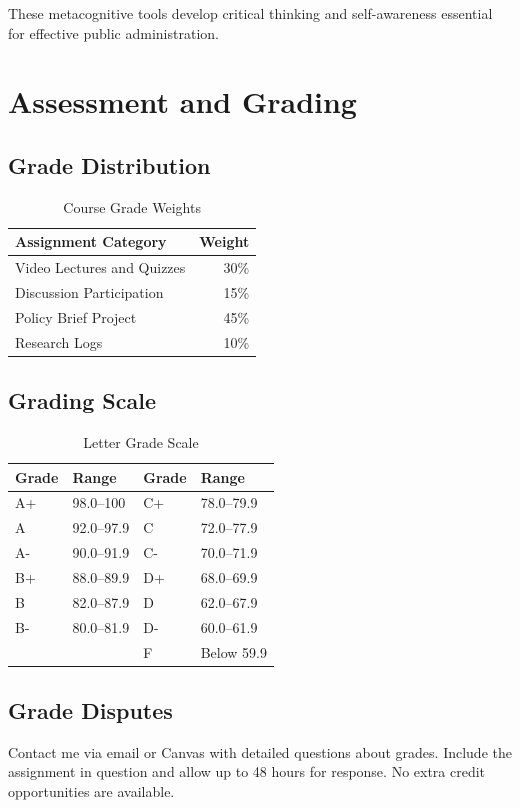 \documentclass[11pt]{scrartcl} %
\begin{document}
These metacognitive tools develop critical thinking and self-awareness essential for effective public administration.

\section{Assessment and Grading}

\subsection{Grade Distribution}
\begin{table}[ht]
\caption{Course Grade Weights}
\centering
\begin{tabular}{>{\raggedright}p{}r}
\toprule
\textbf{Assignment Category} & \textbf{Weight} \\
\midrule
Video Lectures and Quizzes & 30\% \\
Discussion Participation & 15\% \\
Policy Brief Project & 45\% \\
Research Logs & 10\% \\
\bottomrule
\end{tabular}
\label{tab:grade-weights}
\end{table}

\subsection{Grading Scale}
\begin{table}[ht]
\caption{Letter Grade Scale}
\centering
\begin{tabular}{llll}
\toprule
\textbf{Grade} & \textbf{Range} & \textbf{Grade} & \textbf{Range} \\
\midrule
A+ & 98.0--100   & C+ & 78.0--79.9 \\
A  & 92.0--97.9  & C  & 72.0--77.9 \\
A- & 90.0--91.9  & C- & 70.0--71.9 \\
B+ & 88.0--89.9  & D+ & 68.0--69.9 \\
B  & 82.0--87.9  & D  & 62.0--67.9 \\
B- & 80.0--81.9  & D- & 60.0--61.9 \\
   &             & F  & Below 59.9 \\
\bottomrule
\end{tabular}
\label{tab:grading-scale}
\end{table}

\subsection{Grade Disputes}
Contact me via email or Canvas with detailed questions about grades. Include the assignment in question and allow up to 48 hours for response. No extra credit opportunities are available.
\end{document}
